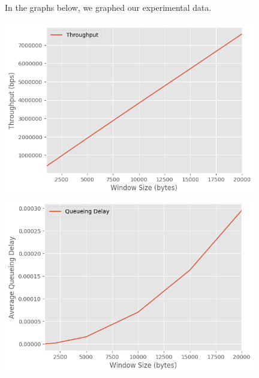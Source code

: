 \documentclass[fleqn,11pt]{article}
\begin{document}
In the graphs below, we graphed our experimental data. 

\includegraphics[width=11cm]{lab2-graph1}
\includegraphics[width=11cm]{lab2-graph2}
\end{document}
